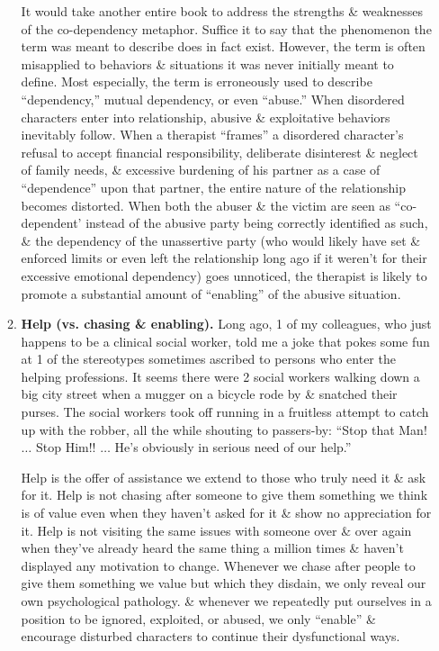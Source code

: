 \documentclass{article}
\numberwithin{equation}{section}
\begin{document}
\begin{itemize}
\begin{enumerate}
		It would take another entire book to address the strengths \& weaknesses of the co-dependency metaphor. Suffice it to say that the phenomenon the term was meant to describe does in fact exist. However, the term is often misapplied to behaviors \& situations it was never initially meant to define. Most especially, the term is erroneously used to describe ``dependency,'' mutual dependency, or even ``abuse.'' When disordered characters enter into relationship, abusive \& exploitative behaviors inevitably follow. When a therapist ``frames'' a disordered character's refusal to accept financial responsibility, deliberate disinterest \& neglect of family needs, \& excessive burdening of his partner as a case of ``dependence'' upon that partner, the entire nature of the relationship becomes distorted. When both the abuser \& the victim are seen as ``co-dependent' instead of the abusive party being correctly identified as such, \& the dependency of the unassertive party (who would likely have set \& enforced limits or even left the relationship long ago if it weren't for their excessive emotional dependency) goes unnoticed, the therapist is likely to promote a substantial amount of ``enabling'' of the abusive situation.
		\item \textbf{Help (vs. chasing \& enabling).} Long ago, 1 of my colleagues, who just happens to be a clinical social worker, told me a joke that pokes some fun at 1 of the stereotypes sometimes ascribed to persons who enter the helping professions. It seems there were 2 social workers walking down a big city street when a mugger on a bicycle rode by \& snatched their purses. The social workers took off running in a fruitless attempt to catch up with the robber, all the while shouting to passers-by: ``Stop that Man! $\ldots$ Stop Him!! $\ldots$ He's obviously in serious need of our help.''
		
		Help is the offer of assistance we extend to those who truly need it \& ask for it. Help is not chasing after someone to give them something we think is of value even when they haven't asked for it \& show no appreciation for it. Help is not visiting the same issues with someone over \& over again when they've already heard the same thing a million times \& haven't displayed any motivation to change. Whenever we chase after people to give them something we value but which they disdain, we only reveal our own psychological pathology. \& whenever we repeatedly put ourselves in a position to be ignored, exploited, or abused, we only ``enable'' \& encourage disturbed characters to continue their dysfunctional ways.
		

\end{enumerate}
\end{itemize}
\end{document}
